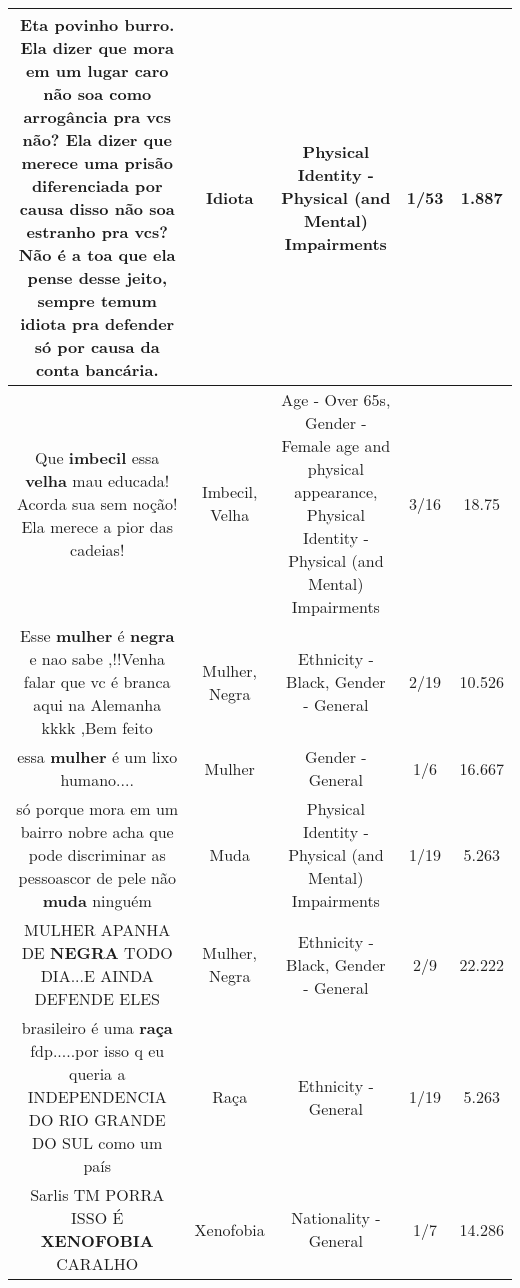 \documentclass[11pt]{article}
\newlength\mylength
\begin{document}
\begin{center}
\begin{longtable}{|C{.65\mylength}|C{.30\mylength}|C{.12\mylength}|C{.12\mylength}|C{.12\mylength}|}
  \small Eta povinho burro. Ela dizer que mora em um lugar caro não soa como arrogância pra vcs não? Ela dizer que merece uma prisão diferenciada por causa disso não soa estranho pra vcs? Não é a toa que ela pense desse jeito, sempre temum \textbf{idiota} pra defender só por causa da conta bancária.\normalsize   & Idiota & Physical Identity - Physical (and Mental) Impairments & 1/53 & 1.887 \\  \hline
  \small Que \textbf{imbecil}  essa \textbf{v\textbf{elha}} mau educada! Acorda sua sem noção! Ela merece a pior das cadeias!\normalsize   & Imbecil, Velha & Age - Over 65s, Gender - Female age and physical appearance, Physical Identity - Physical (and Mental) Impairments & 3/16 & 18.75 \\  \hline
  \small Esse \textbf{mulher} é \textbf{negra} e nao sabe ,!!Venha falar que vc é branca aqui na Alemanha kkkk ,Bem feito\normalsize   & Mulher, Negra & Ethnicity - Black, Gender - General & 2/19 & 10.526 \\  \hline
  \small essa \textbf{mulher} é um lixo humano....\normalsize   & Mulher & Gender - General & 1/6 & 16.667 \\  \hline
  \small só porque mora em um bairro nobre acha que pode discriminar as pessoascor de pele não \textbf{muda} ninguém\normalsize   & Muda & Physical Identity - Physical (and Mental) Impairments & 1/19 & 5.263 \\  \hline
  \small MULHER APANHA DE \textbf{NEGRA} TODO DIA...E AINDA DEFENDE ELES\normalsize   & Mulher, Negra & Ethnicity - Black, Gender - General & 2/9 & 22.222 \\  \hline
  \small brasileiro é uma \textbf{raça} fdp.....por isso q eu queria a INDEPENDENCIA DO RIO GRANDE DO SUL como um país\normalsize   & Raça & Ethnicity - General & 1/19 & 5.263 \\  \hline
  \small Sarlis TM PORRA ISSO É \textbf{XENOFOBIA} CARALHO\normalsize   & Xenofobia & Nationality - General & 1/7 & 14.286 \\  \hline

\end{longtable}
\end{center}
\end{document}
